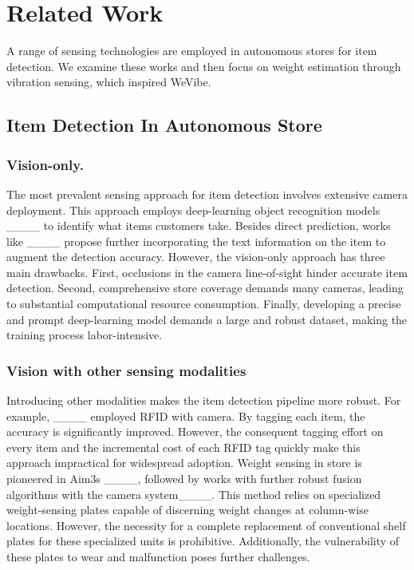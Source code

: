 \section{Related Work}
\label{sec:Related Work} 
A range of sensing technologies are employed in autonomous stores for item detection. We examine these works and then focus on weight estimation through vibration sensing, which inspired WeVibe.


\subsection{Item Detection In Autonomous Store}
\subsubsection{Vision-only.} The most prevalent sensing approach for item detection involves extensive camera deployment. This approach employs deep-learning object recognition models ____ to identify what items customers take. Besides direct prediction, works like ____ propose further incorporating the text information on the item to augment the detection accuracy. However, the vision-only approach has three main drawbacks. First, occlusions in the camera line-of-sight hinder accurate item detection. Second, comprehensive store coverage demands many cameras, leading to substantial computational resource consumption. Finally, developing a precise and prompt deep-learning model demands a large and robust dataset, making the training process labor-intensive.


\subsubsection{Vision with other sensing modalities} Introducing other modalities makes the item detection pipeline more robust. For example, ____ employed RFID with camera. By tagging each item, the accuracy is significantly improved. However, the consequent tagging effort on every item and the incremental cost of each RFID tag quickly make this approach impractical for widespread adoption. Weight sensing in store is pioneered in Aim3s ____, followed by works with further robust fusion algorithms with the camera system____. This method relies on specialized weight-sensing plates capable of discerning weight changes at column-wise locations. However, the necessity for a complete replacement of conventional shelf plates for these specialized units is prohibitive. Additionally, the vulnerability of these plates to wear and malfunction poses further challenges.


